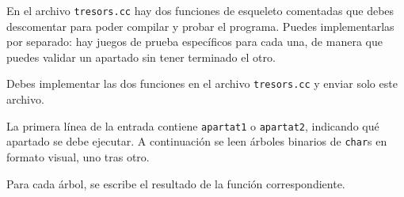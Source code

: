 \medskip

En el archivo \verb|tresors.cc| hay dos funciones de esqueleto comentadas que debes descomentar para poder compilar y probar el programa. Puedes implementarlas por separado: hay juegos de prueba específicos para cada una, de manera que puedes validar un apartado sin tener terminado el otro.

\medskip

Debes implementar las dos funciones en el archivo \verb|tresors.cc| y enviar solo este archivo.

\Input

La primera línea de la entrada contiene \verb|apartat1| o \verb|apartat2|, indicando qué apartado se debe ejecutar. A continuación se leen árboles binarios de \verb|char|s en formato visual, uno tras otro.

\Output

Para cada árbol, se escribe el resultado de la función correspondiente.

\SampleTwoCol
